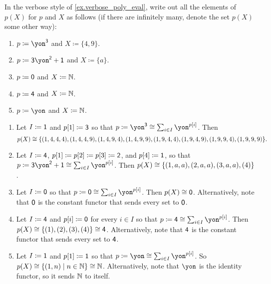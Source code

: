 \documentclass[Book-Poly]{subfiles}
\begin{document}
\begin{exercise}
    In the verbose style of \cref{ex.verbose_poly_eval}, write out all the elements of $p(X)$ for $p$ and $X$ as follows (if there are infinitely many, denote the set $p(X)$ some other way):
    \begin{enumerate}
        \item $p\coloneqq\yon^\3$ and $X\coloneqq\{4,9\}.$
        \item $p\coloneqq\3\yon^\2+\1$ and $X\coloneqq\{a\}$.
        \item $p\coloneqq\textsf{0}$ and $X\coloneqq\mathbb{N}$.
        \item $p\coloneqq\textsf{4}$ and $X\coloneqq\mathbb{N}$.
        \item $p\coloneqq\yon$ and $X\coloneqq\mathbb{N}$.
        \qedhere
    \end{enumerate}
    \begin{solution}
        \begin{enumerate}
            \item Let $I\coloneqq\textsf{1}$ and $p[1]\coloneqq\textsf{3}$ so that $p\coloneqq\yon^\3\iso\sum_{i\in I}\yon^{p[i]}$.
            Then
            \[
            p(X)\cong\{(1, 4, 4, 4), (1, 4, 4, 9), (1, 4, 9, 4), (1, 4, 9, 9), (1, 9, 4, 4), (1, 9, 4, 9), (1, 9, 9, 4), (1, 9, 9, 9)\}.
            \]

            \item Let $I\coloneqq\textsf{4}$, $p[1]\coloneqq p[2]\coloneqq p[3]\coloneqq\textsf{2}$, and $p[4]\coloneqq\textsf{1}$, so that $p\coloneqq\3\yon^\2+\1\iso\sum_{i\in I}\yon^{p[i]}$.
            Then $p(X)\cong\{(1,a,a),(2,a,a),(3,a,a),(4)\}$.

            \item Let $I\coloneqq\textsf{0}$ so that $p\coloneqq\0\iso\sum_{i\in I}\yon^{p[i]}$.
            Then $p(X)\cong\textsf{0}$.
            Alternatively, note that $\textsf{0}$ is the constant functor that sends every set to $\textsf{0}$.

            \item Let $I\coloneqq\textsf{4}$ and $p[i]\coloneqq\textsf{0}$ for every $i\in I$ so that $p\coloneqq\4\iso\sum_{i\in I}\yon^{p[i]}$.
            Then $p(X)\cong\{(1), (2), (3), (4)\}\cong\textsf{4}$.
            Alternatively, note that $\textsf{4}$ is the constant functor that sends every set to $\textsf{4}$.

            \item Let $I \coloneqq \textsf{1}$ and $p[1] \coloneqq \textsf{1}$ so that $p\coloneqq\yon\iso\sum_{i\in I}\yon^{p[i]}$.
            So $p(X)\cong\{(1,n)\mid n\in\mathbb{N}\}\cong\mathbb{N}$.
            Alternatively, note that $\yon$ is the identity functor, so it sends $\mathbb{N}$ to itself.
        \end{enumerate}
    \end{solution}
\end{exercise}
\end{document}
